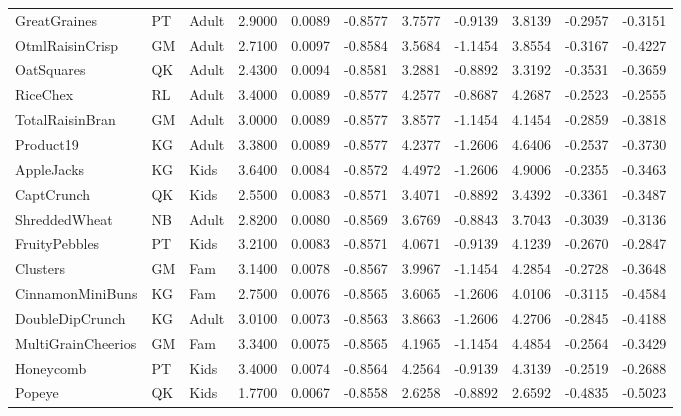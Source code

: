 \begin{table}[!htbp]
\begin{tabular}{lllllllllll}
GreatGraines & PT & Adult & 2.9000 & 0.0089 & -0.8577 & 3.7577 & -0.9139 & 3.8139 & -0.2957 & -0.3151
\\
OtmlRaisinCrisp & GM & Adult & 2.7100 & 0.0097 & -0.8584 & 3.5684 & -1.1454 & 3.8554 & -0.3167 & -0.4227
\\
OatSquares & QK & Adult & 2.4300 & 0.0094 & -0.8581 & 3.2881 & -0.8892 & 3.3192 & -0.3531 & -0.3659
\\
RiceChex & RL & Adult & 3.4000 & 0.0089 & -0.8577 & 4.2577 & -0.8687 & 4.2687 & -0.2523 & -0.2555
\\
TotalRaisinBran & GM & Adult & 3.0000 & 0.0089 & -0.8577 & 3.8577 & -1.1454 & 4.1454 & -0.2859 & -0.3818
\\
Product19 & KG & Adult & 3.3800 & 0.0089 & -0.8577 & 4.2377 & -1.2606 & 4.6406 & -0.2537 & -0.3730
\\
AppleJacks & KG & Kids & 3.6400 & 0.0084 & -0.8572 & 4.4972 & -1.2606 & 4.9006 & -0.2355 & -0.3463
\\
CaptCrunch & QK & Kids & 2.5500 & 0.0083 & -0.8571 & 3.4071 & -0.8892 & 3.4392 & -0.3361 & -0.3487
\\
ShreddedWheat & NB & Adult & 2.8200 & 0.0080 & -0.8569 & 3.6769 & -0.8843 & 3.7043 & -0.3039 & -0.3136
\\
FruityPebbles & PT & Kids & 3.2100 & 0.0083 & -0.8571 & 4.0671 & -0.9139 & 4.1239 & -0.2670 & -0.2847
\\
Clusters & GM & Fam & 3.1400 & 0.0078 & -0.8567 & 3.9967 & -1.1454 & 4.2854 & -0.2728 & -0.3648
\\
CinnamonMiniBuns & KG & Fam & 2.7500 & 0.0076 & -0.8565 & 3.6065 & -1.2606 & 4.0106 & -0.3115 & -0.4584
\\
DoubleDipCrunch & KG & Adult & 3.0100 & 0.0073 & -0.8563 & 3.8663 & -1.2606 & 4.2706 & -0.2845 & -0.4188
\\
MultiGrainCheerios & GM & Fam & 3.3400 & 0.0075 & -0.8565 & 4.1965 & -1.1454 & 4.4854 & -0.2564 & -0.3429
\\
Honeycomb & PT & Kids & 3.4000 & 0.0074 & -0.8564 & 4.2564 & -0.9139 & 4.3139 & -0.2519 & -0.2688
\\
Popeye & QK & Kids & 1.7700 & 0.0067 & -0.8558 & 2.6258 & -0.8892 & 2.6592 & -0.4835 & -0.5023
\\
\hline
\end{tabular}
\end{table}
